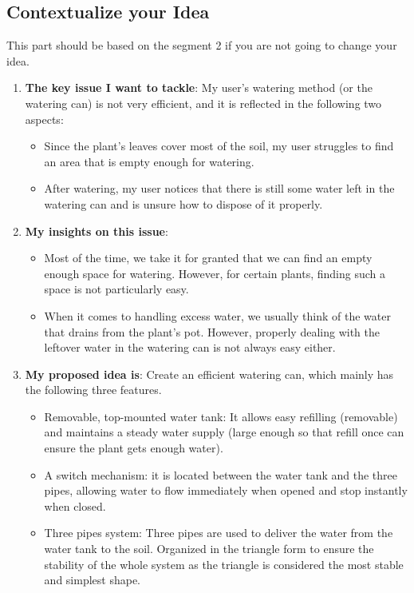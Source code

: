 \documentclass[math,code]{amznotes}
\theoremstyle{remark}
\begin{document}
\subsection{Contextualize your Idea}
This part should be based on the segment 2 if you are not going to change your idea.
\begin{enumerate}
    \item \textbf{The key issue I want to tackle}: My user’s watering method (or the watering can) is not very efficient, and it is reflected in the following two aspects:
    \begin{itemize}
        \item Since the plant's leaves cover most of the soil, my user struggles to find an area that is empty enough for watering.
        \item After watering, my user notices that there is still some water left in the watering can and is unsure how to dispose of it properly.
    \end{itemize}
    \item \textbf{My insights on this issue}:
    \begin{itemize}
        \item Most of the time, we take it for granted that we can find an empty enough space for watering. However, for certain plants, finding such a space is not particularly easy.
        \item When it comes to handling excess water, we usually think of the water that drains from the plant’s pot. However, properly dealing with the leftover water in the watering can is not always easy either.
    \end{itemize}
    \item \textbf{My proposed idea is}: Create an efficient watering can, which mainly has the following three features.
    \begin{itemize}
        \item Removable, top-mounted water tank: It allows easy refilling (removable) and maintains a steady water supply (large enough so that refill once can ensure the plant gets enough water).
        \item A switch mechanism: it is located between the water tank and the three pipes, allowing water to flow immediately when opened and stop instantly when closed. 
        \item Three pipes system: Three pipes are used to deliver the water from the water tank to the soil. Organized in the triangle form to ensure the stability of the whole system as the triangle is considered the most stable and simplest shape.
    \end{itemize}
\end{enumerate}
\end{document}
